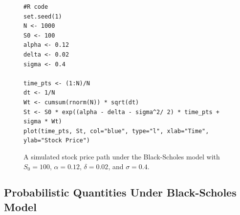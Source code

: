 \begin{enumerate}
\begin{figure}[!h]
\caption{A simulated stock price path under the Black-Scholes model with
\(S_0=100\), \(\alpha=0.12\), \(\delta=0.02\), and \(\sigma=0.4\).}
\begin{verbatim}
#R code
set.seed(1)
N <- 1000
S0 <- 100
alpha <- 0.12
delta <- 0.02
sigma <- 0.4

time_pts <- (1:N)/N
dt <- 1/N
Wt <- cumsum(rnorm(N)) * sqrt(dt)
St <- S0 * exp((alpha - delta - sigma^2/ 2) * time_pts + sigma * Wt)
plot(time_pts, St, col="blue", type="l", xlab="Time", ylab="Stock Price")
\end{verbatim}
\end{figure}
\end{enumerate}
\subsection{Probabilistic Quantities Under Black-Scholes Model}
